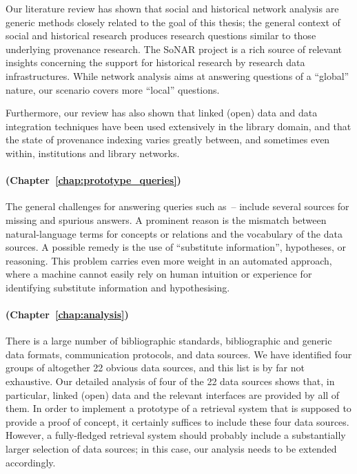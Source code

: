 Our literature review has shown that
social and historical network analysis are generic methods closely related to the goal of this thesis;
the general context of social and historical research produces research questions similar to
those underlying provenance research.
The SoNAR project is a rich source of relevant insights concerning the support for historical research
by research data infrastructures.
While network analysis aims at answering questions of a \enquote{global} nature,
our scenario covers more \enquote{local} questions.

Furthermore, our review has also shown that
linked (open) data and data integration techniques have been used extensively in the library domain,
and that the state of provenance indexing varies greatly between, and sometimes even within,
institutions and library networks.

\paragraph{\RQ[2] (Chapter~\ref{chap:prototype_queries})}

The general challenges for answering queries such as~--
include several sources for missing and spurious answers.
A prominent reason is the mismatch between natural-language terms for concepts or relations
and the vocabulary of the data sources.
A possible remedy is the use of \enquote{substitute information}, hypotheses, or reasoning.
This problem carries even more weight in an automated approach, where
a machine cannot easily rely on human intuition or experience for identifying substitute information
and hypothesising.

\paragraph{\RQ[3] (Chapter~\ref{chap:analysis})}

There is a large number of bibliographic standards, bibliographic and generic data formats,
communication protocols, and data sources. We have identified four groups of altogether 22
obvious data sources, and this list is by far not exhaustive. Our detailed analysis of four
of the 22 data sources shows that, in particular, linked (open) data and the relevant
interfaces are provided by all of them. 
In order to implement a prototype of a retrieval system that is supposed to provide a proof of concept,
it certainly suffices to include these four data sources.
However, a fully-fledged retrieval system should probably include a substantially larger selection of data sources;
in this case, our analysis needs to be extended accordingly.

